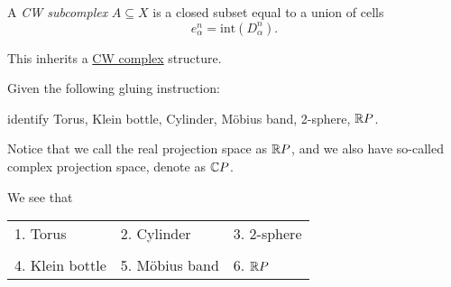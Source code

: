 \begin{definition}[CW subcomplex]\label{def:CW-subcomplex}
	A \emph{CW subcomplex} \(A\subseteq X\) is a closed subset equal to a union of cells
	\[
		e^n_{\alpha} = \mathrm{int}\left(D^n_{\alpha}\right).
	\]
\end{definition}
\begin{remark}
	This inherits a \hyperref[def:CW-Complex]{CW complex} structure.
\end{remark}

\begin{exercise}
	Given the following gluing instruction:
	\begin{figure}[H]
		\centering
		\label{fig:ex:CW-complex-gluing}
	\end{figure}
	identify Torus, Klein bottle, Cylinder, Möbius band, 2-sphere, \(\mathbb{\MakeUppercase{R}} P\).

	\begin{notation}
		Notice that we call the real projection space as \(\mathbb{\MakeUppercase{R}} P\), and we also have so-called
		complex projection space, denote as \(\mathbb{\MakeUppercase{C}} P\).
	\end{notation}
\end{exercise}
\begin{answer}
	We see that
	\begin{table}[H]
		\centering
		\begin{tabular}{lll}
			1. Torus        & 2. Cylinder    & 3. 2-sphere                                 \\\\
			4. Klein bottle & 5. Möbius band & 6.         \(\mathbb{\MakeUppercase{R}} P\) \\
		\end{tabular}
	\end{table}
\end{answer}

